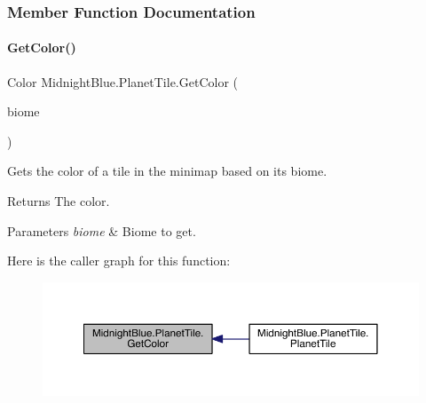 \subsubsection{Member Function Documentation}
\hypertarget{class_midnight_blue_1_1_planet_tile_a0efc70f73aaf5a252cfe6b96deb9aa22}{}\label{class_midnight_blue_1_1_planet_tile_a0efc70f73aaf5a252cfe6b96deb9aa22} 
\paragraph{\texorpdfstring{Get\+Color()}{GetColor()}}
{\footnotesize\ttfamily Color Midnight\+Blue.\+Planet\+Tile.\+Get\+Color (\begin{DoxyParamCaption}\item[{\hyperlink{namespace_midnight_blue_a8a6ba5637b64c3eb991f00d48decf381}{Biome}}]{biome }\end{DoxyParamCaption})\hspace{0.3cm}{\ttfamily [inline]}}



Gets the color of a tile in the minimap based on its biome. 

\begin{DoxyReturn}{Returns}
The color.
\end{DoxyReturn}

\begin{DoxyParams}{Parameters}
{\em biome} & Biome to get.\\
\hline
\end{DoxyParams}
Here is the caller graph for this function\+:\nopagebreak
\begin{figure}[H]
\begin{center}
\leavevmode
\includegraphics[width=350pt]{class_midnight_blue_1_1_planet_tile_a0efc70f73aaf5a252cfe6b96deb9aa22_icgraph}
\end{center}
\end{figure}
\hypertarget{class_midnight_blue_1_1_planet_tile_a0ba5d9886790e8f8d9e54e1873d5565b}{}\label{class_midnight_blue_1_1_planet_tile_a0ba5d9886790e8f8d9e54e1873d5565b} 
